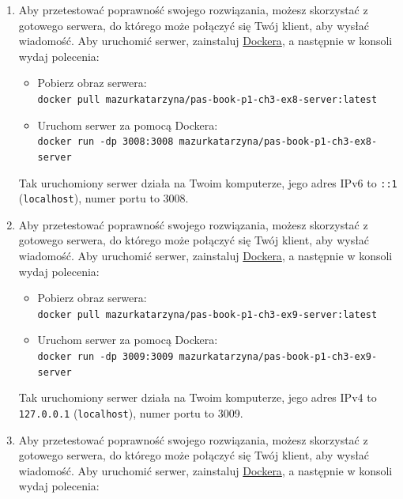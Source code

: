 \begin{enumerate}[label=\textbf{3.\arabic*}]
\item Aby przetestować poprawność swojego rozwiązania, możesz skorzystać z gotowego serwera, do którego może połączyć się Twój klient, aby wysłać wiadomość. Aby uruchomić serwer, zainstaluj \href{https://www.docker.com/}{Dockera}, a następnie w konsoli wydaj polecenia:

\begin{itemize}
\item Pobierz obraz serwera:\\ \texttt{docker pull mazurkatarzyna/pas-book-p1-ch3-ex8-server:latest}

\item Uruchom serwer za pomocą Dockera:\\ \texttt{docker run -dp 3008:3008 mazurkatarzyna/pas-book-p1-ch3-ex8-server}
\end{itemize}

\noindent Tak uruchomiony serwer działa na Twoim komputerze, jego adres IPv6 to \texttt{::1} (\texttt{localhost}), numer portu to 3008.
\item Aby przetestować poprawność swojego rozwiązania, możesz skorzystać z gotowego serwera, do którego może połączyć się Twój klient, aby wysłać wiadomość. Aby uruchomić serwer, zainstaluj \href{https://www.docker.com/}{Dockera}, a następnie w konsoli wydaj polecenia:

\begin{itemize}
\item Pobierz obraz serwera:\\ \texttt{docker pull mazurkatarzyna/pas-book-p1-ch3-ex9-server:latest}

\item Uruchom serwer za pomocą Dockera:\\ \texttt{docker run -dp 3009:3009 mazurkatarzyna/pas-book-p1-ch3-ex9-server}
\end{itemize}

\noindent Tak uruchomiony serwer działa na Twoim komputerze, jego adres IPv4 to \texttt{127.0.0.1} (\texttt{localhost}), numer portu to 3009.
\item Aby przetestować poprawność swojego rozwiązania, możesz skorzystać z gotowego serwera, do którego może połączyć się Twój klient, aby wysłać wiadomość. Aby uruchomić serwer, zainstaluj \href{https://www.docker.com/}{Dockera}, a następnie w konsoli wydaj polecenia:


\end{enumerate}
